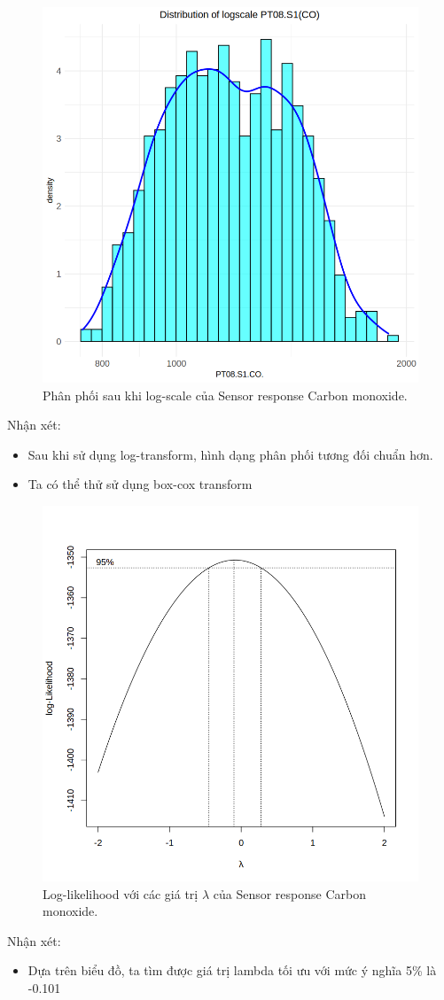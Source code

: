 \begin{figure}[H]
    \centering
    \includegraphics[width=0.75\columnwidth]{air_figures/PT08.S1(CO)_logscale_distribution.png}
    \caption{Phân phối sau khi log-scale của Sensor response Carbon monoxide.}
    \label{fig:srco_logscale_distribution}
\end{figure}
Nhận xét:
\begin{itemize}
    \item Sau khi sử dụng log-transform, hình dạng phân phối tương đối chuẩn hơn.
    \item Ta có thể thử sử dụng box-cox transform
\end{itemize}

\begin{figure}[H]
    \centering
    \includegraphics[width=0.75\columnwidth]{air_figures/PT08.S1(CO)_optimal_lambda.png}
    \caption{Log-likelihood với các giá trị $\lambda$ của Sensor response Carbon monoxide.}
    \label{fig:srco_optimal_lambda}
\end{figure}
Nhận xét:
\begin{itemize}
    \item Dựa trên biểu đồ, ta tìm được giá trị lambda tối ưu với mức ý nghĩa 5\% là -0.101
\end{itemize}

